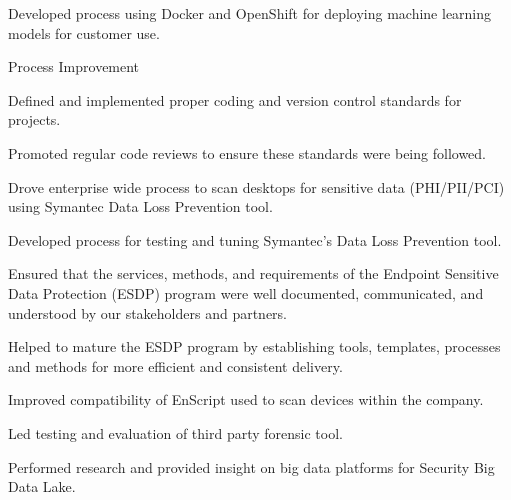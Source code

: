 \documentclass[]{deedy-resume-openfont}
\begin{document}
\begin{tightemize}
    \vspace{\topsep}
    \begin{tightemize}
    \item Developed process using Docker and OpenShift for deploying machine learning models for customer use.
    \end{tightemize}
    \vspace{\topsep}
\item Process Improvement
    \vspace{\topsep}
    \begin{tightemize}
    \item Defined and implemented proper coding and version control standards for projects.
    \item Promoted regular code reviews to ensure these standards were being followed.
    \end{tightemize}
    \vspace{\topsep}
\end{tightemize}
\sectionsep

\vspace{\topsep} 
\begin{tightemize}
\item Drove enterprise wide process to scan desktops for sensitive data (PHI/PII/PCI) using Symantec Data Loss Prevention tool.
\item Developed process for testing and tuning Symantec's Data Loss Prevention tool.
\item Ensured that the services, methods, and requirements of the Endpoint Sensitive Data Protection (ESDP) program were well documented, communicated, and understood by our stakeholders and partners.
\item Helped to mature the ESDP program by establishing tools, templates, processes and methods for more efficient and consistent delivery.
\end{tightemize}
\sectionsep

\vspace{\topsep} 
\begin{tightemize}
\item Improved compatibility of EnScript used to scan devices within the company.
\item Led testing and evaluation of third party forensic tool.
\item Performed research and provided insight on big data platforms for Security Big Data Lake.
\end{tightemize}
\sectionsep
\end{document}
